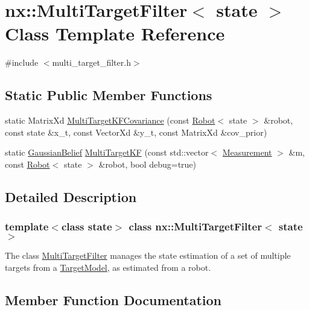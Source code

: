 \hypertarget{classnx_1_1MultiTargetFilter}{}\section{nx\+:\+:Multi\+Target\+Filter$<$ state $>$ Class Template Reference}
\label{classnx_1_1MultiTargetFilter}


{\ttfamily \#include $<$multi\+\_\+target\+\_\+filter.\+h$>$}

\subsection*{Static Public Member Functions}
\begin{DoxyCompactItemize}
\item 
static Matrix\+Xd \hyperlink{classnx_1_1MultiTargetFilter_ae10c905dd3a2be6f1966a590aa5ff541}{Multi\+Target\+K\+F\+Covariance} (const \hyperlink{classnx_1_1Robot}{Robot}$<$ state $>$ \&robot, const state \&x\+\_\+t, const Vector\+Xd \&y\+\_\+t, const Matrix\+Xd \&cov\+\_\+prior)
\item 
static \hyperlink{structnx_1_1GaussianBelief}{Gaussian\+Belief} \hyperlink{classnx_1_1MultiTargetFilter_a40bccb9c8566afbee26054c137ff92ef}{Multi\+Target\+KF} (const std\+::vector$<$ \hyperlink{structnx_1_1Measurement}{Measurement} $>$ \&m, const \hyperlink{classnx_1_1Robot}{Robot}$<$ state $>$ \&robot, bool debug=true)
\end{DoxyCompactItemize}


\subsection{Detailed Description}
\subsubsection*{template$<$class state$>$\newline
class nx\+::\+Multi\+Target\+Filter$<$ state $>$}

The class \hyperlink{classnx_1_1MultiTargetFilter}{Multi\+Target\+Filter} manages the state estimation of a set of multiple targets from a \hyperlink{classnx_1_1TargetModel}{Target\+Model}, as estimated from a robot. 

\subsection{Member Function Documentation}
\mbox{\label{classnx_1_1MultiTargetFilter_a40bccb9c8566afbee26054c137ff92ef}} 
